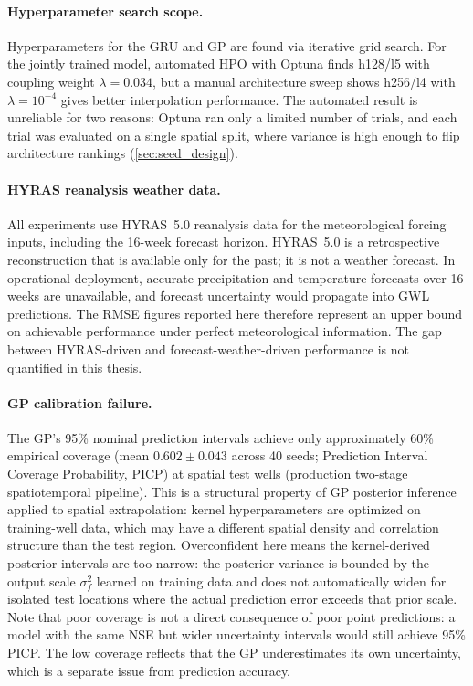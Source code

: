 \paragraph{Hyperparameter search scope.}
Hyperparameters for the GRU and GP are found via iterative grid search. For the jointly trained model, automated HPO with Optuna \citep{akiba2019optuna} finds h128/l5 with coupling weight $\lambda = 0.034$, but a manual architecture sweep shows h256/l4 with $\lambda = 10^{-4}$ gives better interpolation performance. The automated result is unreliable for two reasons: Optuna ran only a limited number of trials, and each trial was evaluated on a single spatial split, where variance is high enough to flip architecture rankings (\cref{sec:seed_design}).

\paragraph{HYRAS reanalysis weather data.}
All experiments use HYRAS~5.0 reanalysis data for the meteorological forcing inputs, including the 16-week forecast horizon. HYRAS~5.0 is a retrospective reconstruction that is available only for the past; it is not a weather forecast. In operational deployment, accurate precipitation and temperature forecasts over 16 weeks are unavailable, and forecast uncertainty would propagate into GWL predictions. The RMSE figures reported here therefore represent an upper bound on achievable performance under perfect meteorological information. The gap between HYRAS-driven and forecast-weather-driven performance is not quantified in this thesis.

\paragraph{GP calibration failure.}
The GP's 95\% nominal prediction intervals achieve only approximately 60\% empirical coverage (mean $0.602 \pm 0.043$ across 40 seeds; Prediction Interval Coverage Probability, PICP) at spatial test wells (production two-stage spatiotemporal pipeline). This is a structural property of GP posterior inference applied to spatial extrapolation: kernel hyperparameters are optimized on training-well data, which may have a different spatial density and correlation structure than the test region. Overconfident here means the kernel-derived posterior intervals are too narrow: the posterior variance is bounded by the output scale $\sigma_f^2$ learned on training data and does not automatically widen for isolated test locations where the actual prediction error exceeds that prior scale. Note that poor coverage is not a direct consequence of poor point predictions: a model with the same NSE but wider uncertainty intervals would still achieve 95\% PICP. The low coverage reflects that the GP underestimates its own uncertainty, which is a separate issue from prediction accuracy.


